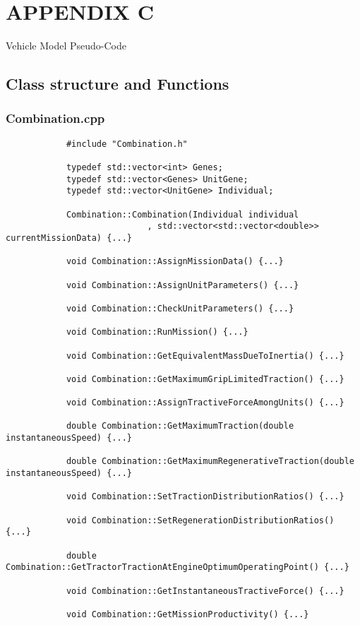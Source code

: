 \documentclass[ExampleMasters.tex]{subfiles}
\begin{document}
	\chapter{APPENDIX C}
	{\Large Vehicle Model Pseudo-Code}

		\section{Class structure and Functions} \label{sec:appendixcodeoverview}

		\subsection{Combination.cpp} \label{sec:appendixcombination}
			\begin{verbatim}
			#include "Combination.h"

			typedef std::vector<int> Genes;
			typedef std::vector<Genes> UnitGene;
			typedef std::vector<UnitGene> Individual;

			Combination::Combination(Individual individual
							, std::vector<std::vector<double>> currentMissionData) {...}

			void Combination::AssignMissionData() {...}

			void Combination::AssignUnitParameters() {...}

			void Combination::CheckUnitParameters() {...}

			void Combination::RunMission() {...}

			void Combination::GetEquivalentMassDueToInertia() {...}

			void Combination::GetMaximumGripLimitedTraction() {...}

			void Combination::AssignTractiveForceAmongUnits() {...}

			double Combination::GetMaximumTraction(double instantaneousSpeed) {...}

			double Combination::GetMaximumRegenerativeTraction(double instantaneousSpeed) {...}

			void Combination::SetTractionDistributionRatios() {...}

			void Combination::SetRegenerationDistributionRatios() {...}

			double Combination::GetTractorTractionAtEngineOptimumOperatingPoint() {...}

			void Combination::GetInstantaneousTractiveForce() {...}

			void Combination::GetMissionProductivity() {...}


\end{verbatim}
\end{document}
